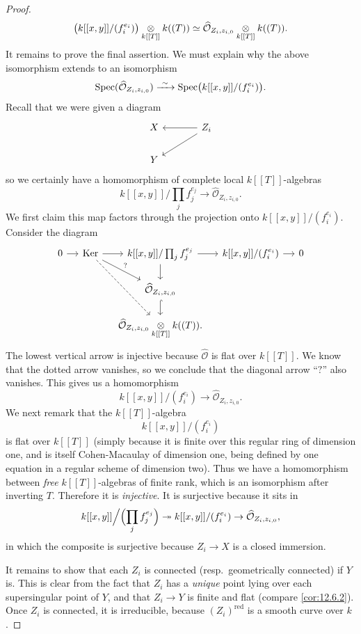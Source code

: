 \begin{proof}
\[
\bigl( k[[x, y]]/(f_i^{e_i}) \bigr) \underset{k[[T]]}{\otimes} k((T)) \simeq \widehat{\mathcal{O}}_{Z_i, z_{i,0}} \underset{k[[T]]}{\otimes} k((T)) .
\]
It remains to prove the final assertion. We must explain why the above isomorphism extends to an isomorphism
\[
\operatorname{Spec}(\widehat{\mathcal{O}}_{Z_i, z_{i,0}}) \xrightarrow{\ \sim\ } \operatorname{Spec}\bigl( k[[x, y]]/(f_i^{e_i}) \bigr) .
\]
Recall that we were given a diagram
\[
\begin{tikzcd}[row sep=1.8em, column sep=large]
X & Z_i \arrow[l] \arrow[ld] \\
Y &
\end{tikzcd}
\]
so we certainly have a homomorphism of complete local $k[[T]]$-algebras
\[
k[[x, y]]\Big/\prod_j f_j^{e_j} \to \widehat{\mathcal{O}}_{Z_i, z_{i,0}} .
\]
We first claim this map factors through the projection onto $k[[x, y]]/(f_i^{e_i})$. Consider the diagram
\[
\begin{tikzcd}[row sep=1.6em, column sep=small]
0 \arrow[r] & \Ker \arrow[r] \arrow[rd, "?"] \arrow[rdd, dashed] &
k[[x, y]]/\prod_j f_j^{e_j} \arrow[r] \arrow[d] & k[[x, y]]/(f_i^{e_i}) \arrow[r] & 0 \\
&& \widehat{\mathcal{O}}_{Z_i, z_{i,0}} \arrow[d, hook] && \\
&& \widehat{\mathcal{O}}_{Z_i, z_{i,0}} \tens{k[[T]]} k((T)) . &&
\end{tikzcd}
\]
The lowest vertical arrow is injective because $\widehat{\mathcal{O}}$ is flat over $k[[T]]$. We know that the dotted arrow vanishes, so we conclude that the diagonal arrow ``$?$'' also vanishes. This gives us a homomorphism
\[
k[[x, y]]/(f_i^{e_i}) \to \widehat{\mathcal{O}}_{Z_i, z_{i,0}} .
\]
We next remark that the $k[[T]]$-algebra
\[
k[[x, y]]/(f_i^{e_i})
\]
is flat over $k[[T]]$ (simply because it is finite over this regular ring of dimension one, and is itself Cohen-Macaulay of dimension one, being defined by one equation in a regular scheme of dimension two). Thus we have a homomorphism between \emph{free} $k[[T]]$-algebras of finite rank, which is an isomorphism after inverting $T$. Therefore it is \emph{injective}. It is surjective because it sits in
\[
k[[x, y]]\Big/\Bigl(\prod_j f_j^{e_j}\Bigr) \twoheadrightarrow k[[x, y]]/(f_i^{e_i}) \to \widehat{\mathcal{O}}_{Z_i, z_{i,0}} ,
\]
in which the composite is surjective because $Z_i \to X$ is a closed immersion.

It remains to show that each $Z_i$ is connected (resp.~geometrically connected) if $Y$ is. This is clear from the fact that $Z_i$ has a \emph{unique} point lying over each supersingular point of $Y$, and that $Z_i \to Y$ is finite and flat (compare \ref{cor:12.6.2}). Once $Z_i$ is connected, it is irreducible, because $(Z_i)^{\mathrm{red}}$ is a smooth curve over $k$.
\end{proof}

